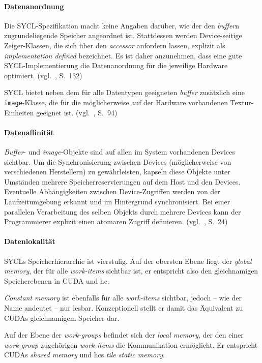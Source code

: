 \paragraph{Datenanordnung}

Die SYCL-Spezifikation macht keine Angaben darüber, wie der den \textit{buffer}n
zugrundeliegende Speicher angeordnet ist. Stattdessen werden Device-seitige
Zeiger-Klassen, die sich über den \textit{accessor} anfordern lassen, explizit
als \textit{implementation defined} bezeichnet. Es ist daher anzunehmen, dass
eine gute SYCL-Implementierung die Datenanordnung für die jeweilige Hardware
optimiert. (vgl.~\cite{syclspec}, S.\ 132)

SYCL bietet neben dem für alle Datentypen geeigneten \textit{buffer} zusätzlich
eine \texttt{image}-Klasse, die für die möglicherweise auf der Hardware
vorhandenen Textur-Einheiten geeignet ist. (vgl.~\cite{syclspec}, S.\ 94)

\paragraph{Datenaffinität}

\textit{Buffer}- und \textit{image}-Objekte sind auf allen im System vorhandenen
Devices sichtbar. Um die Synchronisierung zwischen Devices (möglicherweise von
verschiedenen Herstellern) zu gewährleisten, kapseln diese Objekte unter
Umständen mehrere Speicherreservierungen auf dem Host und den Devices.
Eventuelle Abhängigkeiten zwischen Device-Zugriffen werden von der
Laufzeitumgebung erkannt und im Hintergrund synchronisiert. Bei einer
parallelen Verarbeitung des selben Objekts durch mehrere Devices kann der
Programmierer explizit einen atomaren Zugriff definieren.
(vgl.~\cite{syclspec}, S.\ 24)

\paragraph{Datenlokalität}

SYCLs Speicherhierarchie ist vierstufig. Auf der obersten Ebene liegt der
\textit{global memory}, der für alle \textit{work-items} sichtbar ist, er
entspricht also den gleichnamigen Speicherebenen in CUDA und \gls{hc}.

\textit{Constant memory} ist ebenfalls für alle \textit{work-items} sichtbar,
jedoch -- wie der Name andeutet -- nur lesbar. Konzeptionell stellt er damit
das Äquivalent zu CUDAs gleichnamigem Speicher dar.

Auf der Ebene der \textit{work-groups} befindet sich der \textit{local memory},
der den einer \textit{work-group} zugehörigen \textit{work-items} die
Kommunikation ermöglicht. Er entspricht CUDAs \textit{shared memory} und
\gls{hc}s \textit{tile static memory}.

